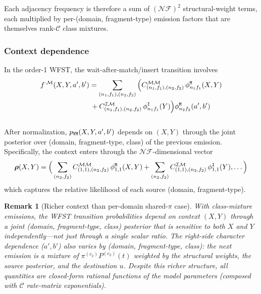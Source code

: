 \documentclass{article}
\newtheorem{remark}{Remark}
\newcommand\dom{n}
\newcommand\ndom{\mathcal{N}}
\newcommand\nfrag{\mathcal{F}}
\newcommand\classdist{u}
\newcommand\anctok{a}
\newcommand\destok{b}
\newcommand\eqm{\pi}
\newcommand\evoltime{t}
\newcommand\mat{{\tt M}}
\newcommand\ins{{\tt I}}
\newcommand\waitm{{\tt V}}
\newcommand\frag{f}
\newcommand\class{c}
\newcommand\nclasses{\mathcal{C}}
\begin{document}
Each adjacency frequency is therefore a sum of $(\ndom\nfrag)^2$
structural-weight terms, each multiplied by per-(domain, fragment-type)
emission factors that are themselves rank-$\nclasses$ class mixtures.

\subsubsection{Context dependence}

In the order-1 WFST, the wait-after-match/insert transition involves
\begin{align*}
&f^{\cdot\mathcal{M}}(X,Y,\anctok',\destok')
= \sum_{(\dom_1,\frag_1),(\dom_2,\frag_2)}
  \Big( C^{\mathcal{M}\mathcal{M}}_{(\dom_1,\frag_1),(\dom_2,\frag_2)}\,
        \phi^{\mat}_{\dom_1\frag_1}(X,Y) \\
&\phantom{= \sum_{(\dom_1,\frag_1),(\dom_2,\frag_2)} \Big(}
      + C^{\mathcal{I}\mathcal{M}}_{(\dom_1,\frag_1),(\dom_2,\frag_2)}\,
        \phi^{\ins}_{\dom_1\frag_1}(Y) \Big)
  \phi^{\mat}_{\dom_2\frag_2}(\anctok',\destok')
\end{align*}

After normalization, $p_{\waitm\mat}(X,Y,\anctok',\destok')$ depends on
$(X,Y)$ through the joint posterior over (domain, fragment-type, class)
of the previous emission. Specifically, the context enters through the
$\ndom\nfrag$-dimensional vector
\[
\boldsymbol{\rho}(X,Y) = \Big(
  \sum_{(\dom_2,\frag_2)} C^{\mathcal{M}\mathcal{M}}_{(1,1),(\dom_2,\frag_2)}\,
  \phi^{\mat}_{1,1}(X,Y)
  + \sum_{(\dom_2,\frag_2)} C^{\mathcal{I}\mathcal{M}}_{(1,1),(\dom_2,\frag_2)}\,
  \phi^{\ins}_{1,1}(Y), \ldots \Big)
\]
which captures the relative likelihood of each source (domain, fragment-type).

\begin{remark}[Richer context than per-domain shared-$\eqm$ case]
With class-mixture emissions, the WFST transition probabilities depend
on context $(X,Y)$ through a joint (domain, fragment-type, class)
posterior that is sensitive to \emph{both} $X$ and $Y$ independently---not
just through a single scalar ratio. The right-side character dependence
($\anctok', \destok'$) also varies by (domain, fragment-type, class):
the next emission is a mixture of
$\eqm^{(\class_2)} P^{(\class_2)}(\evoltime)$ weighted by the structural
weights, the source posterior, and the destination $\classdist$.
Despite this richer structure, all quantities are closed-form rational
functions of the model parameters (composed with $\nclasses$ rate-matrix
exponentials).
\end{remark}
\end{document}
